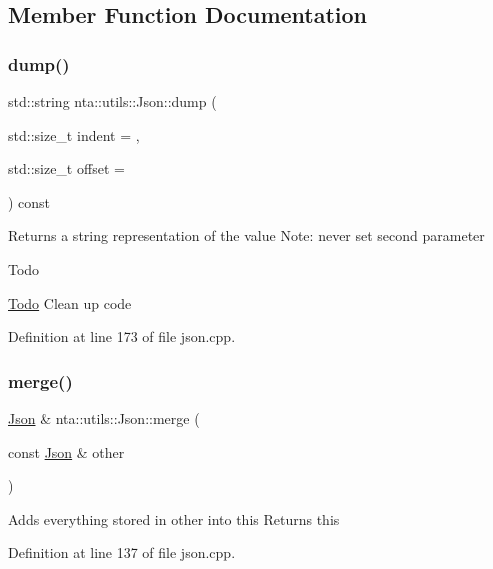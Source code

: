 \subsection{Member Function Documentation}
\mbox{\label{classnta_1_1utils_1_1Json_ab0e60f7a55d12aab005d420c8f924035}} 
\subsubsection{\texorpdfstring{dump()}{dump()}}
{\footnotesize\ttfamily std\+::string nta\+::utils\+::\+Json\+::dump (\begin{DoxyParamCaption}\item[{std\+::size\+\_\+t}]{indent = {},  }\item[{std\+::size\+\_\+t}]{offset = {} }\end{DoxyParamCaption}) const}

Returns a string representation of the value Note\+: never set second parameter

\begin{DoxyRefDesc}{Todo}
\item[\hyperlink{todo__todo000024}{Todo}]Clean up code \end{DoxyRefDesc}


Definition at line 173 of file json.\+cpp.

\mbox{\label{classnta_1_1utils_1_1Json_ac33a8a65bdfaff7c365f99c9ca71eeab}} 
\subsubsection{\texorpdfstring{merge()}{merge()}}
{\footnotesize\ttfamily \hyperlink{classnta_1_1utils_1_1Json}{Json} \& nta\+::utils\+::\+Json\+::merge (\begin{DoxyParamCaption}\item[{const \hyperlink{classnta_1_1utils_1_1Json}{Json} \&}]{other }\end{DoxyParamCaption})}

Adds everything stored in other into this Returns this 

Definition at line 137 of file json.\+cpp.

